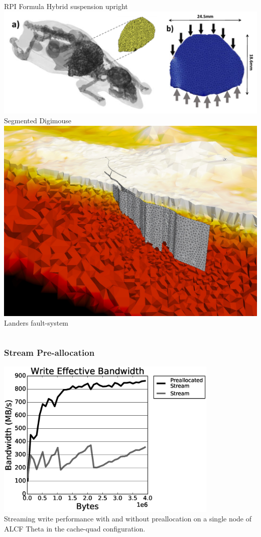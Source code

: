 \documentclass{beamer}
\begin{document}
\begin{frame}
\begin{columns}
\begin{column}{0.4\textwidth}
      RPI Formula Hybrid suspension upright
      \includegraphics[width=.9\textwidth]{../workflows/figures/digimouse_edmans.png}\\
      Segmented Digimouse~\cite{edmansMeshMonteCarlo2015}
      \includegraphics[width=.8\textwidth]{../workflows/figures/landersMesh.pdf}\\
      Landers fault-system~\cite{seisSolGeomPoster,seisSolGordonBell2014}
    \end{column}
  \end{columns}
\end{frame}

\begin{frame}
  \frametitle{Stream Pre-allocation}
  \centering
  \includegraphics[width=0.8\textwidth]{../imp/results/streamPrealloc/streamPreallocWriteEffectiveBandwidth.eps}\\
  Streaming write performance with and without preallocation on a single node
    of ALCF Theta in the cache-quad configuration.
\end{frame}
\end{document}

